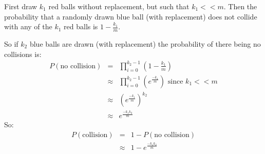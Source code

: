 First draw $k_1$ red balls without replacement, but such that $k_1 << m$. Then the probability that a randomly drawn blue ball (with replacement) does not collide with any of the $k_1$ red balls is $1-\frac{k_1}{m}$.

So if $k_2$ blue balls are drawn (with replacement) the probability of there being no collisions is: 
\begin{eqnarray*}
    P(\text{no collision}) &=& \prod_{i = 0}^{k_2 - 1}(1-\frac{k_1}{m})\\
    &\approx& \prod_{i = 0}^{k_2 - 1}(e^\frac{-k_1}{m}) \text{ since $k_1 << m$}\\
    &\approx& (e^\frac{-k_1}{m})^{k_2}\\
    &\approx& e^{\frac{-k_1 k_2}{m}}
\end{eqnarray*}
So:
\begin{eqnarray*}
    P(\text{collision}) &=& 1 - P(\text{no collision})\\
    &\approx& 1 - e^\frac{-k_1 k_2}{m} 
\end{eqnarray*}